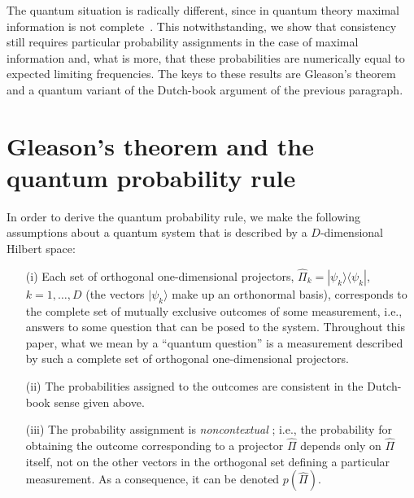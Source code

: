 \documentclass[aps,12pt]{revtex4}
\begin{document}
The quantum situation is radically different, since in quantum theory
maximal information is not complete~\cite{Israel}.  This
notwithstanding, we show that consistency still requires particular
probability assignments in the case of maximal information and, what
is more, that these probabilities are numerically equal to expected
limiting frequencies.  The keys to these results are Gleason's
theorem and a quantum variant of the Dutch-book argument of the
previous paragraph.

\section{Gleason's theorem and the quantum probability rule}

In order to derive the quantum probability rule, we make the
following assumptions about a quantum system that is described by a
$D$-dimensional Hilbert space:

\begin{itemize}
\item[(i)]Each set of orthogonal one-dimensional projectors,
$\hat\Pi_k=|\psi_k\rangle\langle\psi_k|$, $k=1,\ldots,D$ (the vectors
$|\psi_k\rangle$ make up an orthonormal basis), corresponds to the
complete set of mutually exclusive outcomes of some measurement,
i.e., answers to some question that can be posed to the system.
Throughout this paper, what we mean by a ``quantum question'' is a
measurement described by such a complete set of orthogonal
one-dimensional projectors.

\item[(ii)]The probabilities assigned to the outcomes are
consistent in the Dutch-book sense given above.

\item[(iii)]The probability assignment is {\it noncontextual\/}
\cite{Barnum}; i.e., the probability for obtaining the outcome
corresponding to a projector $\hat\Pi$ depends only on $\hat\Pi$
itself, not on the other vectors in the orthogonal set defining a
particular measurement.  As a consequence, it can be denoted
$p(\hat\Pi)$.
\end{itemize}
\end{document}
